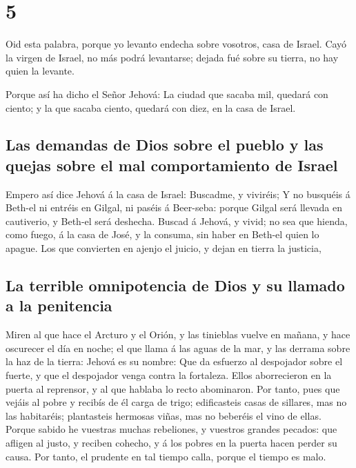 \hypertarget{section-30-5}{%
\section{5}\label{section-30-5}}

 Oid esta palabra, porque yo levanto endecha sobre
vosotros, casa de Israel.  Cayó la virgen de Israel, no
más podrá levantarse; dejada fué sobre su tierra, no hay quien la
levante.

 Porque así ha dicho el Señor Jehová: La ciudad que sacaba
mil, quedará con ciento; y la que sacaba ciento, quedará con diez, en la
casa de Israel.

\hypertarget{las-demandas-de-dios-sobre-el-pueblo-y-las-quejas-sobre-el-mal-comportamiento-de-israel}{%
\subsection{Las demandas de Dios sobre el pueblo y las quejas sobre el
mal comportamiento de
Israel}\label{las-demandas-de-dios-sobre-el-pueblo-y-las-quejas-sobre-el-mal-comportamiento-de-israel}}

 Empero así dice Jehová á la casa de Israel: Buscadme, y
viviréis;  Y no busquéis á Beth-el ni entréis en Gilgal,
ni paséis á Beer-seba: porque Gilgal será llevada en cautiverio, y
Beth-el será deshecha.  Buscad á Jehová, y vivid; no sea
que hienda, como fuego, á la casa de José, y la consuma, sin haber en
Beth-el quien lo apague.  Los que convierten en ajenjo el
juicio, y dejan en tierra la justicia,

\hypertarget{la-terrible-omnipotencia-de-dios-y-su-llamado-a-la-penitencia}{%
\subsection{La terrible omnipotencia de Dios y su llamado a la
penitencia}\label{la-terrible-omnipotencia-de-dios-y-su-llamado-a-la-penitencia}}

 Miren al que hace el Arcturo y el Orión, y las tinieblas
vuelve en mañana, y hace oscurecer el día en noche; el que llama á las
aguas de la mar, y las derrama sobre la haz de la tierra: Jehová es su
nombre:  Que da esfuerzo al despojador sobre el fuerte, y
que el despojador venga contra la fortaleza.  Ellos
aborrecieron en la puerta al reprensor, y al que hablaba lo recto
abominaron.  Por tanto, pues que vejáis al pobre y
recibís de él carga de trigo; edificasteis casas de sillares, mas no las
habitaréis; plantasteis hermosas viñas, mas no beberéis el vino de
ellas.  Porque sabido he vuestras muchas rebeliones, y
vuestros grandes pecados: que afligen al justo, y reciben cohecho, y á
los pobres en la puerta hacen perder su causa.  Por
tanto, el prudente en tal tiempo calla, porque el tiempo es malo.

